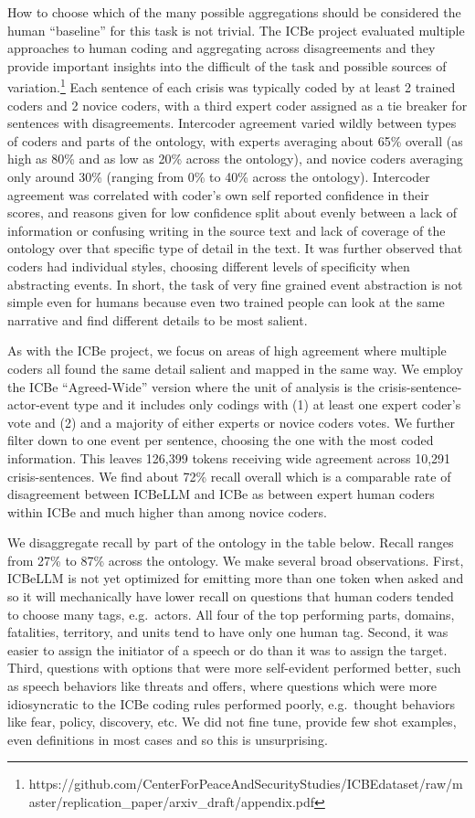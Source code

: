\documentclass[
  letterpaper,
  DIV=11,
  numbers=noendperiod]{scrartcl}
\begin{document}
How to choose which of the many possible aggregations should be
considered the human ``baseline'' for this task is not trivial. The ICBe
project evaluated multiple approaches to human coding and aggregating
across disagreements and they provide important insights into the
difficult of the task and possible sources of variation.\footnote{https://github.com/CenterForPeaceAndSecurityStudies/ICBEdataset/raw/master/replication\_paper/arxiv\_draft/appendix.pdf}
Each sentence of each crisis was typically coded by at least 2 trained
coders and 2 novice coders, with a third expert coder assigned as a tie
breaker for sentences with disagreements. Intercoder agreement varied
wildly between types of coders and parts of the ontology, with experts
averaging about 65\% overall (as high as 80\% and as low as 20\% across
the ontology), and novice coders averaging only around 30\% (ranging
from 0\% to 40\% across the ontology). Intercoder agreement was
correlated with coder's own self reported confidence in their scores,
and reasons given for low confidence split about evenly between a lack
of information or confusing writing in the source text and lack of
coverage of the ontology over that specific type of detail in the text.
It was further observed that coders had individual styles, choosing
different levels of specificity when abstracting events. In short, the
task of very fine grained event abstraction is not simple even for
humans because even two trained people can look at the same narrative
and find different details to be most salient.

As with the ICBe project, we focus on areas of high agreement where
multiple coders all found the same detail salient and mapped in the same
way. We employ the ICBe ``Agreed-Wide'' version where the unit of
analysis is the crisis-sentence-actor-event type and it includes only
codings with (1) at least one expert coder's vote and (2) and a majority
of either experts or novice coders votes. We further filter down to one
event per sentence, choosing the one with the most coded information.
This leaves 126,399 tokens receiving wide agreement across 10,291
crisis-sentences. We find about 72\% recall overall which is a
comparable rate of disagreement between ICBeLLM and ICBe as between
expert human coders within ICBe and much higher than among novice
coders.

We disaggregate recall by part of the ontology in the table below.
Recall ranges from 27\% to 87\% across the ontology. We make several
broad observations. First, ICBeLLM is not yet optimized for emitting
more than one token when asked and so it will mechanically have lower
recall on questions that human coders tended to choose many tags,
e.g.~actors. All four of the top performing parts, domains, fatalities,
territory, and units tend to have only one human tag. Second, it was
easier to assign the initiator of a speech or do than it was to assign
the target. Third, questions with options that were more self-evident
performed better, such as speech behaviors like threats and offers,
where questions which were more idiosyncratic to the ICBe coding rules
performed poorly, e.g.~thought behaviors like fear, policy, discovery,
etc. We did not fine tune, provide few shot examples, even definitions
in most cases and so this is unsurprising.
\end{document}
